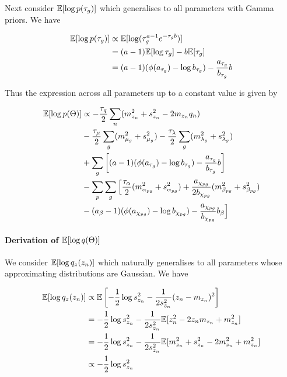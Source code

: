 Next consider $\mathbb{E}[\log p (\tau_g)]$ which generalises to all parameters with Gamma priors. We have

\begin{equation}
\begin{aligned}
\mathbb{E}[\log p(\tau_g)] & \propto \mathbb{E}[\log(\tau_g^{a-1} e^{-\tau_g b})] \\
& = (a-1) \mathbb{E}[\log \tau_g] - b \mathbb{E}[\tau_g] \\
& = (a-1)(\phi(a_{\tau_g}) - \log b_{\tau_g}) - \frac{a_{\tau_g}}{b_{\tau_g}} b
\end{aligned}
\end{equation}

Thus the expression across all parameters up to a constant value is given by

\begin{equation}
\begin{aligned}
\mathbb{E}[\log p(\Theta)] & \propto - \frac{\tau_q}{2}\sum_n (m_{z_n}^2 + s_{z_n}^2 - 2 m_{z_n} q_n) \\
& -\frac{\tau_\mu}{2} \sum_g (m_{\mu_g}^2 +  s_{\mu_g}^2)  - \frac{\tau_\lambda}{2} \sum_g (m_{\lambda_g}^2 + s_{\lambda_g}^2) \\
& + \sum_g \left[ (a-1)(\phi(a_{\tau_g}) - \log b_{\tau_g}) - \frac{a_{\tau_g}}{b_{\tau_g}} b \right] \\
& - \sum_p \sum_g \Big[ \frac{\tau_\alpha}{2} (m_{\alpha_{pg}}^2 + s_{\alpha_{pg}}^2) + \frac{a_{\chi_{pg}}}{2 b_{\chi_{pg}}} (m_{\beta_{pg}}^2 + s_{\beta_{pg}}^2) \\
& - (a_\beta - 1) (\phi(a_{\chi_{pg}}) - \log b_{\chi_{pg}} ) - \frac{a_{\chi_{pg}}}{b_{\chi_{pg}}} b_\beta \Big]
\end{aligned}
\end{equation}

\paragraph{Derivation of $\mathbb{E}[\log q(\Theta)]$}

We consider $\mathbb{E}[\log q_z (z_n)]$ which naturally generalises to all parameters whose approximating distributions are Gaussian. We have

\begin{equation}
\begin{aligned}
\mathbb{E}[\log q_z(z_n)] & \propto \mathbb{E}\left[ -\frac{1}{2} \log s_{z_n}^2 - \frac{1}{2 s_{z_n}^2} (z_n - m_{z_n})^2\right] \\
& = -\frac{1}{2} \log s_{z_n}^2 - \frac{1}{2 s_{z_n}^2} \mathbb{E}[ z_n^2 - 2 z_n m_{z_n} + m_{z_n}^2 ] \\
& = -\frac{1}{2} \log s_{z_n}^2 - \frac{1}{2 s_{z_n}^2} \mathbb{E}[ m_{z_n}^2 + s_{z_n}^2 - 2 m_{z_n}^2 + m_{z_n}^2 ] \\
& \propto-\frac{1}{2} \log s_{z_n}^2
\end{aligned}
\end{equation}

